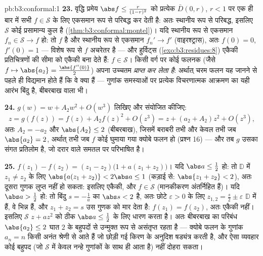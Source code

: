 \begin{solution}{pb:b3:conformal:1}
\textbf{23.} वृद्धि प्रमेय $\abs f \leq
\frac{r}{(1-r)^2}$ को प्रत्येक $\bar D(0, r)$, $r <
1$ पर एक ही
बार में सभी $f \in \mathcal S$ के लिए एकसमान रूप से परिबद्ध कर देती है: अतः स्थानीय
रूप से परिबद्ध, इसलिए $\mathcal S$ कोई प्रसामान्य कुल है (\cref{thm:b3:conformal:montel})। यदि
स्थानीय रूप से एकसमान $f_n \in \mathcal S \to
f$ हो: तो $f$  है और स्थानीय
रूप से एकसमान $f_n' \to f'$ (वाइरश्ट्रास), अतः $f(0) = 0$, $f'(0) = 1$ --- विशेष रूप
से $f$ अचरेतर है --- और हुर्विट्स (\cref{exo:b3:residues:8}) एकैकी प्रतिचित्रणों की
सीमा को एकैकी बना देते हैं: $f \in \mathcal S$। किसी  वर्ग पर कोई  फलनक
(जैसे $f \mapsto \abs{a_2} = \frac{\abs{f''(0)}}2$) अपना उच्चतम \emph{प्राप्त कर लेता है}: अर्थात् चरम फलन
यह जानने से पहले ही विद्यमान होते हैं कि वे क्या हैं --- गुणांक
समस्याओं पर प्रत्येक विचरणात्मक आक्रमण का यही आरंभ बिंदु है, बीबरबाख
वाला भी।

\textbf{24.} $g(w) = w + A_2w^2 + O(w^3)$ लिखिए और संयोजित कीजिए:
\[
z = g(f(z)) = f(z) + A_2f(z)^2 + O(z^3)
= z + (a_2 + A_2)z^2 + O(z^3),
\]
अतः $A_2 = -a_2$ और $\abs{A_2} \leq 2$ (बीबरबाख), जिसमें बराबरी तभी और केवल तभी जब $\abs{a_2} = 2$,
अर्थात् तभी जब $f$ कोई घुमाया गया क्योबे फलन हो (प्रश्न 16) ---
और तब $g$ उसका संगत प्रतिलोम है, जो दरार वाले समतल पर परिभाषित है।

\textbf{25.} $f(z_1) - f(z_2) = (z_1 - z_2)\bigl(1 + a(z_1 +
z_2)\bigr)$। यदि $\abs a \leq \frac12$ हो: तो $\mathbb D$ में $z_1 \neq z_2$ के लिए $\abs{a(z_1 + z_2)} < 2\abs a \leq 1$
(कड़ाई से: $\abs{z_1 + z_2} < 2$), अतः दूसरा गुणक लुप्त नहीं हो सकता: इसलिए एकैकी,
और $f \in \mathcal S$ (मानकीकरण अंतर्निहित हैं)। यदि $\abs a > \frac12$ हो: तो बिंदु $s =
-\frac1a$ का
$\abs s < 2$ है, अतः छोटे $\varepsilon > 0$ के लिए $z_{1,2} = \frac s2 \pm
\varepsilon$ $\mathbb D$ में हैं, वे भिन्न हैं,
और $z_1 + z_2 = s$ उस गुणक को मार देता है: $f(z_1)
= f(z_2)$, अतः एकैकी नहीं। इसलिए $\mathcal S$
$z +
az^2$ को ठीक $\abs a \leq \frac12$ के लिए धारण करता है। अतः बीबरबाख का परिबंध $\abs{a_2} \leq 2$
घात $2$ के बहुपदों से उन्मुक्त रूप से असंतृप्त रहता है --- क्योबे
फलन के गुणांक $a_n = n$ किसी अनंत श्रेणी से आते हैं जो छोड़ी गई किरण के
अनुदिश षड्यंत्र करती है, और ऐसा व्यवहार कोई बहुपद (जो $\mathcal S$ में केवल
नन्हे गुणांकों के साथ ही आता है) नहीं दोहरा सकता।
\end{solution}
